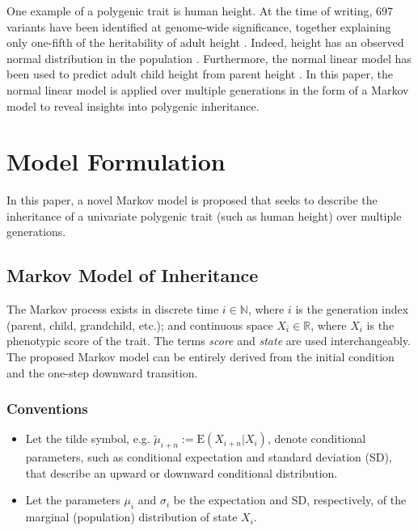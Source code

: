 \documentclass{svproc} %
\begin{document}
One example of a polygenic trait is human height. At the time of writing, 697 variants have been identified at genome-wide significance, together explaining only one-fifth of the heritability of adult height \cite{preece, wood}. Indeed, height has an observed normal distribution in the population \cite{luo}. Furthermore, the normal linear model has been used to predict adult child height from parent height \cite{luo}. In this paper, the normal linear model is applied over multiple generations in the form of a Markov model to reveal insights into polygenic inheritance.


\section{Model Formulation}

In this paper, a novel Markov model is proposed that seeks to describe the inheritance of a univariate polygenic trait (such as human height) over multiple generations. 


\subsection{Markov Model of Inheritance} \label{model_intro}

The Markov process exists in discrete time $ i \in \mathbb{N}$, where $i$ is the generation index (parent, child, grandchild, etc.); and continuous space $X_i \in \mathbb{R}$, where $X_i$ is the phenotypic score of the trait. The terms \emph{score} and \emph{state} are used interchangeably. The proposed Markov model can be entirely derived from the initial condition and the one-step downward transition. 


\subsubsection{Conventions} 

\begin{itemize}
\item Let the tilde symbol, e.g. $\tilde{\mu}_{i+n} := \mathrm{E}(X_{i+n}|X_i)$, denote conditional parameters, such as conditional expectation and standard deviation (SD), that describe an upward or downward conditional distribution. 
\item Let the parameters $\mu_i$ and $\sigma_i$ be the expectation and SD, respectively, of the marginal (population) distribution of state $X_i$. 
\end{itemize}
\end{document}
